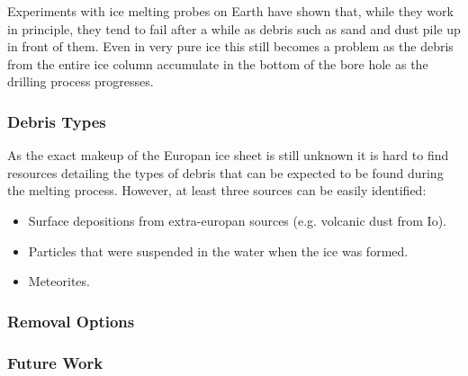 Experiments with ice melting probes on Earth have shown that, while they work in principle, they tend to fail after a while as debris such as sand and dust pile up in front of them\cite{article:di1998}. Even in very pure ice this still becomes a problem as the debris from the entire ice column accumulate in the bottom of the bore hole as the drilling process progresses. 

\subsubsection{Debris Types}
As the exact makeup of the Europan ice sheet is still unknown it is hard to find resources detailing the types of debris that can be expected to be found during the melting process. However, at least three sources can be easily identified:\\

\begin{itemize}
	\item Surface depositions from extra-europan sources (e.g. volcanic dust from Io).
	\item Particles that were suspended in the water when the ice was formed.
	\item Meteorites.
\end{itemize}



\subsubsection{Removal Options}

\subsubsection{Future Work}